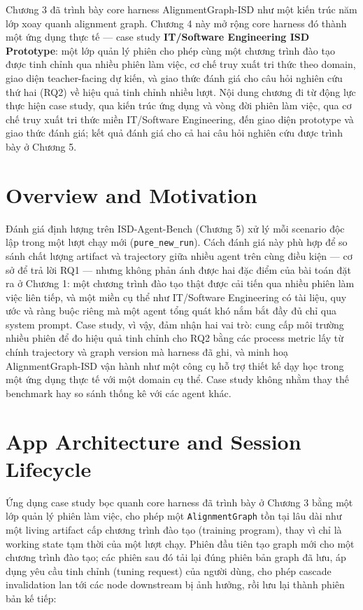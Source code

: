 \documentclass[../main.tex]{subfiles}
\begin{document}
Chương 3 đã trình bày core harness AlignmentGraph-ISD như một kiến trúc năm lớp xoay quanh alignment graph. Chương 4 này mở rộng core harness đó thành một ứng dụng thực tế — case study \textbf{IT/Software Engineering ISD Prototype}: một lớp quản lý phiên cho phép cùng một chương trình đào tạo được tinh chỉnh qua nhiều phiên làm việc, cơ chế truy xuất tri thức theo domain, giao diện teacher-facing dự kiến, và giao thức đánh giá cho câu hỏi nghiên cứu thứ hai (RQ2) về hiệu quả tinh chỉnh nhiều lượt. Nội dung chương đi từ động lực thực hiện case study, qua kiến trúc ứng dụng và vòng đời phiên làm việc, qua cơ chế truy xuất tri thức miền IT/Software Engineering, đến giao diện prototype và giao thức đánh giá; kết quả đánh giá cho cả hai câu hỏi nghiên cứu được trình bày ở Chương 5.

\section{Overview and Motivation}

Đánh giá định lượng trên ISD-Agent-Bench (Chương 5) xử lý mỗi scenario độc lập trong một lượt chạy mới (\texttt{pure\_new\_run}). Cách đánh giá này phù hợp để so sánh chất lượng artifact và trajectory giữa nhiều agent trên cùng điều kiện — cơ sở để trả lời RQ1 — nhưng không phản ánh được hai đặc điểm của bài toán đặt ra ở Chương 1: một chương trình đào tạo thật được cải tiến qua nhiều phiên làm việc liên tiếp, và một miền cụ thể như IT/Software Engineering có tài liệu, quy ước và ràng buộc riêng mà một agent tổng quát khó nắm bắt đầy đủ chỉ qua system prompt. Case study, vì vậy, đảm nhận hai vai trò: cung cấp môi trường nhiều phiên để đo hiệu quả tinh chỉnh cho RQ2 bằng các process metric lấy từ chính trajectory và graph version mà harness đã ghi, và minh hoạ AlignmentGraph-ISD vận hành như một công cụ hỗ trợ thiết kế dạy học trong một ứng dụng thực tế với một domain cụ thể. Case study không nhằm thay thế benchmark hay so sánh thống kê với các agent khác.

\section{App Architecture and Session Lifecycle}

Ứng dụng case study bọc quanh core harness đã trình bày ở Chương 3 bằng một lớp quản lý phiên làm việc, cho phép một \texttt{AlignmentGraph} tồn tại lâu dài như một living artifact cấp chương trình đào tạo (training program), thay vì chỉ là working state tạm thời của một lượt chạy. Phiên đầu tiên tạo graph mới cho một chương trình đào tạo; các phiên sau đó tải lại đúng phiên bản graph đã lưu, áp dụng yêu cầu tinh chỉnh (tuning request) của người dùng, cho phép cascade invalidation lan tới các node downstream bị ảnh hưởng, rồi lưu lại thành phiên bản kế tiếp:
\end{document}
